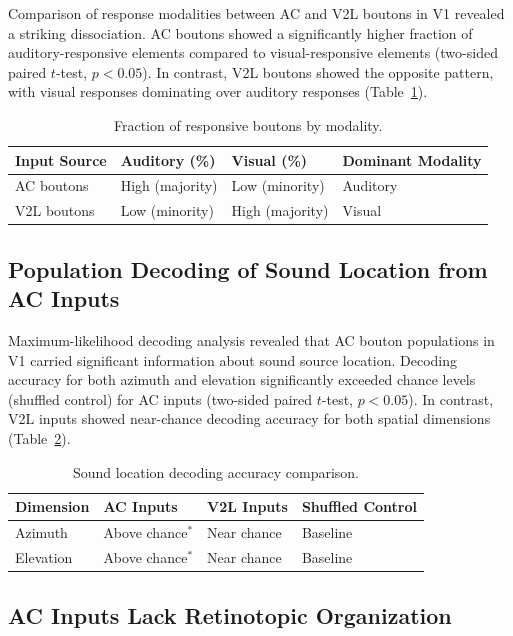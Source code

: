 \documentclass[11pt]{article}
\begin{document}
Comparison of response modalities between AC and V2L boutons in V1 revealed a striking dissociation. AC boutons showed a significantly higher fraction of auditory-responsive elements compared to visual-responsive elements (two-sided paired $t$-test, $p < 0.05$). In contrast, V2L boutons showed the opposite pattern, with visual responses dominating over auditory responses (Table~\ref{tab:modality}).

\begin{table}[htbp]
\centering
\caption{Fraction of responsive boutons by modality.}
\label{tab:modality}
\begin{tabular}{llll}
\toprule
Input Source & Auditory (\%) & Visual (\%) & Dominant Modality \\
\midrule
AC boutons & High (majority) & Low (minority) & Auditory \\
V2L boutons & Low (minority) & High (majority) & Visual \\
\bottomrule
\end{tabular}
\end{table}

\subsection{Population Decoding of Sound Location from AC Inputs}

Maximum-likelihood decoding analysis revealed that AC bouton populations in V1 carried significant information about sound source location. Decoding accuracy for both azimuth and elevation significantly exceeded chance levels (shuffled control) for AC inputs (two-sided paired $t$-test, $p < 0.05$). In contrast, V2L inputs showed near-chance decoding accuracy for both spatial dimensions (Table~\ref{tab:decoding}).

\begin{table}[htbp]
\centering
\caption{Sound location decoding accuracy comparison.}
\label{tab:decoding}
\begin{tabular}{llll}
\toprule
Dimension & AC Inputs & V2L Inputs & Shuffled Control \\
\midrule
Azimuth & Above chance$^{*}$ & Near chance & Baseline \\
Elevation & Above chance$^{*}$ & Near chance & Baseline \\
\bottomrule
\end{tabular}
\end{table}

\subsection{AC Inputs Lack Retinotopic Organization}
\end{document}
